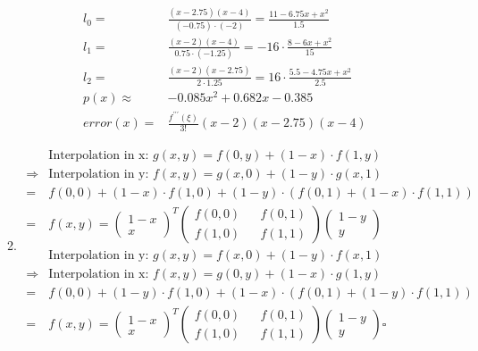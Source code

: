 \documentclass[]{book}
\theoremstyle{definition}
\begin{document}
\begin{enumerate}
\begin{enumerate}
\begin{align*}
            l_0 = & \frac{(x - 2.75)(x -4)}{(-0.75) \cdot (- 2)} = \frac{11 - 6.75 x + x^2}{1.5}  \\
            l_1 = & \frac{(x - 2)(x -4)}{0.75 \cdot (- 1.25)} = -16 \cdot \frac{8 - 6 x + x^2}{15} \\
            l_2 = & \frac{(x - 2)(x - 2.75)}{2 \cdot 1.25} = 16 \cdot \frac{5.5 - 4.75 x + x^2}{2.5} \\
            p(x) \approx & -0.085x^2 + 0.682x - 0.385 \\
            error(x) = & \frac{f^{\prime\prime\prime}(\xi)}{3!}(x - 2)(x - 2.75)(x - 4)
        \end{align*}
        \item \begin{align*}
            & \text{Interpolation in x: } g(x, y) = f(0, y) + (1 - x) \cdot f(1, y) \\
            \Rightarrow & \text{Interpolation in y: } f(x, y) = g(x, 0) + (1 - y) \cdot g(x, 1) \\ 
            = & f(0, 0) + (1 - x) \cdot f(1, 0) + (1 - y) \cdot (f(0, 1) + (1 - x) \cdot f(1, 1)) \\
            = & f(x, y) = \begin{pmatrix}
                1 - x \\
                x
            \end{pmatrix}^T
            \begin{pmatrix}
                f(0, 0) && f(0, 1)\\
                f(1, 0) && f(1, 1)
            \end{pmatrix}
            \begin{pmatrix}
                1 - y \\
                y
            \end{pmatrix} \\
            & \text{Interpolation in y: } g(x, y) = f(x, 0) + (1 - y) \cdot f(x, 1) \\
            \Rightarrow & \text{Interpolation in x: } f(x, y) = g(0, y) + (1 - x) \cdot g(1, y) \\
            = & f(0, 0) + (1 - y) \cdot f(1, 0) + (1 - x) \cdot (f(0, 1) + (1 - y) \cdot f(1, 1)) \\
            = & f(x, y) = \begin{pmatrix}
                1 - x \\
                x
            \end{pmatrix}^T
            \begin{pmatrix}
                f(0, 0) && f(0, 1)\\
                f(1, 0) && f(1, 1)
            \end{pmatrix}
            \begin{pmatrix}
                1 - y \\
                y
            \end{pmatrix} \square
        \end{align*}
    \end{enumerate}
\end{enumerate}
\end{document}
